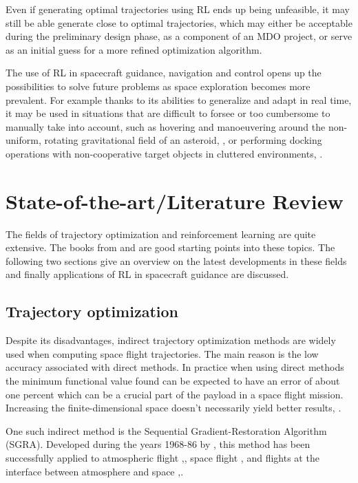 \documentclass[12pt, english, NoHyper]{AE4010-template}
\begin{document}
Even if generating optimal trajectories using RL ends up being unfeasible, it may still be able generate close to optimal trajectories, which may either be acceptable during the preliminary design phase, as a component of an MDO project, or serve as an initial guess for a more refined optimization algorithm.

The use of RL in spacecraft guidance, navigation and control opens up the possibilities to solve future problems as space exploration becomes more prevalent. For example thanks to its abilities to generalize and adapt in real time, it may be used in situations that are difficult to forsee or too cumbersome to manually take into account, such as hovering and manoeuvering around the non-uniform, rotating gravitational field of an asteroid, \cite{gaudet2012robust, willis2016reinforcement}, or performing docking operations with non-cooperative target objects in cluttered environments, \cite{hovell2020deep, hovell2021deep, broida2019spacecraft}.





\section{State-of-the-art/Literature Review}
The fields of trajectory optimization and reinforcement learning are quite extensive. The books from \cite{betts2010practical} and \cite{sutton2018reinforcement} are good starting points into these topics. The following two sections give an overview on the latest developments in these fields and finally applications of RL in spacecraft guidance are discussed. 

\subsection{Trajectory optimization}
Despite its disadvantages, indirect trajectory optimization methods are widely used when computing space flight trajectories. The main reason is the low accuracy associated with direct methods. In practice when using direct methods the minimum functional value found can be expected to have an error of about one percent which can be a crucial part of the payload in a space flight mission. Increasing the finite-dimensional space doesn't necessarily yield better results, \cite{von1992direct}.

One such indirect method is the Sequential Gradient-Restoration Algorithm (SGRA). Developed during the years 1968-86 by \cite{miele1970sequential}, this method has been successfully applied to atmospheric flight ,\cite{miele1986optimal}, space flight ,\cite{miele1999optimaltransfers, miele2001optimaltrajectories} and flights at the interface between atmosphere and space ,\cite{miele1998optimal, miele1993nominal, miele2000feasibility, miele2001assessment}. 
\end{document}
